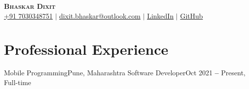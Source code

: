 \documentclass{resume}
\begin{document}

\begin{center}
    \textbf{\Huge \scshape Bhaskar Dixit} \\ \vspace{3pt}
    \small
    \faMobile \hspace{.5pt} \href{tel:917030348751}{+91 7030348751}
    $|$
    \faAt \hspace{.5pt} \href{mailto:dixit.bhaskar@outlook.com}{dixit.bhaskar@outlook.com}
    $|$
    \faLinkedinSquare \hspace{.5pt} \href{https://www.linkedin.com/in/bhaskar-dixit}{LinkedIn}
    $|$
    \faGithub \hspace{.5pt} \href{https://github.com/devBhaskar98}{GitHub}
\end{center}


\section{Professional Experience}
\vspace{3pt}

\resumeSubHeadingListStart
\resumeSubheading
      {Mobile Programming}{Pune, Maharashtra}
      {Software Developer}{Oct 2021 \textbf{--} Present, Full-time}
\end{document}
